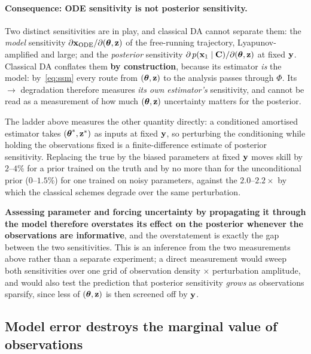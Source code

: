 \paragraph{Consequence: ODE sensitivity is not posterior sensitivity.}
\label{sec:sensitivity}
Two distinct sensitivities are in play, and classical DA cannot separate them:
the \emph{model} sensitivity $\partial \mathbf{x}_{\mathrm{ODE}}/\partial(\boldsymbol{\theta},\mathbf{z})$ of
the free-running trajectory, Lyapunov-amplified and large; and the
\emph{posterior} sensitivity $\partial\, p(\mathbf{x}_1\mid\mathbf{C})/\partial(\boldsymbol{\theta},\mathbf{z})$ at
fixed $\mathbf{y}$. Classical DA conflates them \textbf{by construction}, because its
estimator \emph{is} the model: by~\eqref{eq:ssm} every route from $(\boldsymbol{\theta},\mathbf{z})$ to
the analysis passes through $\Phi$. Its \Sz{}$\to$\So{} degradation therefore
measures \emph{its own estimator's} sensitivity, and cannot be read as a
measurement of how much $(\boldsymbol{\theta},\mathbf{z})$ uncertainty matters for the posterior.

The ladder above measures the other quantity directly: a conditioned amortised
estimator takes $(\boldsymbol{\theta}^{*},\mathbf{z}^{*})$ as inputs at fixed $\mathbf{y}$, so perturbing the
conditioning while holding the observations fixed is a finite-difference estimate
of posterior sensitivity. Replacing the true by the biased parameters at fixed
$\mathbf{y}$ moves skill by $2$--$4\%$ for a prior trained on the truth and by no more
than for the unconditional prior ($0$--$1.5\%$) for one trained on noisy
parameters, against the $2.0$--$2.2\times$ by which the classical schemes degrade
over the same perturbation.

\textbf{Assessing parameter and forcing uncertainty by propagating it through the
model therefore overstates its effect on the posterior whenever the observations
are informative}, and the overstatement is exactly the gap between the two
sensitivities. This is an inference from the two measurements above rather than a
separate experiment; a direct measurement would sweep both sensitivities over one
grid of observation density $\times$ perturbation amplitude, and would also test
the prediction that posterior sensitivity \emph{grows} as observations sparsify,
since less of $(\boldsymbol{\theta},\mathbf{z})$ is then screened off by $\mathbf{y}$.

\subsection{Model error destroys the marginal value of observations}
\label{sec:marginal}

